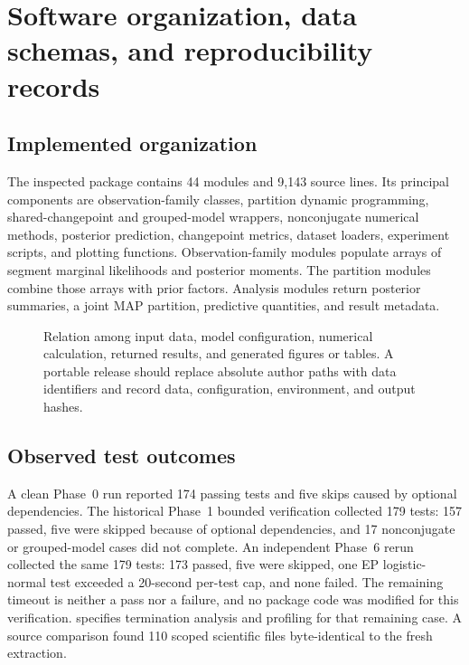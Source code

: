 \chapter{Software organization, data schemas, and reproducibility records}
\label{ch:software}

\section{Implemented organization}
The inspected package contains 44 modules and 9,143 source lines. Its principal components are
observation-family classes, partition dynamic programming, shared-changepoint and grouped-model
wrappers, nonconjugate numerical methods, posterior prediction, changepoint metrics, dataset
loaders, experiment scripts, and plotting functions. Observation-family modules populate arrays of
segment marginal likelihoods and posterior moments. The partition modules combine those arrays
with prior factors. Analysis modules return posterior summaries, a joint MAP partition, predictive
quantities, and result metadata.

\begin{figure}[H]
\centering
\resizebox{0.96\textwidth}{!}{}
\caption{Relation among input data, model configuration, numerical calculation, returned results,
and generated figures or tables. A portable release should replace absolute author paths with data
identifiers and record data, configuration, environment, and output hashes.}
\label{fig:repository-provenance}
\end{figure}

\section{Observed test outcomes}
A clean Phase~0 run reported 174 passing tests and five skips caused by optional dependencies. The
historical Phase~1 bounded verification collected 179 tests: 157 passed, five were skipped because
of optional dependencies, and 17 nonconjugate or grouped-model cases did not complete. An
independent Phase~6 rerun collected the same 179 tests: 173 passed, five were skipped, one EP
logistic-normal test exceeded a 20-second per-test cap, and none failed. The remaining timeout is
neither a pass nor a failure, and no package code was modified for this verification.
 specifies termination analysis and profiling for that remaining case. A source comparison found 110 scoped scientific files byte-identical to the fresh
extraction.

